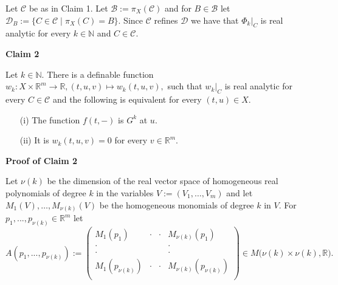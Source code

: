 \documentclass[12pt]{article}
\def\vs{\vspace}
\begin{document}
\vs{0.4cm}
Let $\mathcal{C}$ be as in Claim 1. Let $\mathcal{B}:=\pi_X(\mathcal{C})$ and for $B \in \mathcal{B}$ let $\mathcal{D}_B:=\{C \in \mathcal{C} \mid \pi_X(C)=B\}$. Since $\mathcal{C}$ refines $\mathcal{D}$ we have that $\Phi_k|_C$ is real analytic for every $k \in \mathbb{N}$ and $C \in \mathcal{C}$.

\vs{0.5cm}
{\bf Claim 2}

\vs{0.1cm}
Let $k \in \mathbb{N}$. There is a definable function $w_k:X \times \mathbb{R}^m \to \mathbb{R}, (t,u,v) \mapsto w_k(t,u,v),$ such that $w_k|_C$ is real analytic for every $C \in \mathcal{C}$ and the following is equivalent for every $(t,u) \in X$.
	\begin{itemize}
		\item[(i)] The function $f(t,-)$ is $G^k$ at $u$.
		\item[(ii)] It is $w_k(t,u,v)=0$ for every $v \in \mathbb{R}^m$. 
\end{itemize}

\vs{0.4cm}
{\bf Proof of Claim 2}
 
\vs{0.1cm}
Let $\nu(k)$ be the dimension of the real vector space of homogeneous real polynomials of degree $k$ in the variables $V:=(V_1,\ldots,V_m)$
and let $M_1(V),\ldots,M_{\nu(k)}(V)$ be the homogeneous monomials of degree $k$ in $V$. For $p_1,...,p_{\nu(k)} \in \mathbb{R}^m$ let 
$$A(p_1,...,p_{\nu(k)}):=\left(\begin{array}{cccc}
M_1(p_1)&\cdot&\cdot&M_{\nu(k)}(p_1)\\
\cdot&& &\cdot\\
\cdot&& &\cdot\\
M_1(p_{\nu(k)})&\cdot&\cdot&M_{\nu(k)}(p_{\nu(k)})\\
\end{array}\right)\in M\big(\nu(k) \times \nu(k),\mathbb{R}).$$
\end{document}
